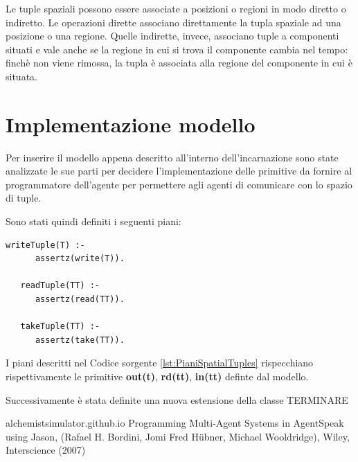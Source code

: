 \documentclass[12pt,a4paper,openright,twoside]{report}
\begin{document}
Le tuple spaziali possono essere associate a posizioni o regioni in modo diretto o indiretto. Le operazioni dirette associano direttamente la tupla spaziale ad una posizione o una regione. Quelle indirette, invece, associano tuple a componenti situati e vale anche se la regione in cui si trova il componente cambia nel tempo: finch\`e non viene rimossa, la tupla \`e associata alla regione del componente in cui \`e situata.


\section{Implementazione modello}
Per inserire il modello appena descritto all'interno dell'incarnazione sono state analizzate le sue parti per decidere l'implementazione delle primitive da fornire al programmatore dell'agente per permettere agli agenti di comunicare con lo spazio di tuple.

Sono stati quindi definiti i seguenti piani:
\medskip
\begin{lstlisting}[firstnumber=1,label={lst:PianiSpatialTuples},caption={Piani Spatial Tuples}]
   writeTuple(T) :-
      assertz(write(T)).

   readTuple(TT) :-
      assertz(read(TT)).

   takeTuple(TT) :-
      assertz(take(TT)).
\end{lstlisting}

I piani descritti nel Codice sorgente \ref{lst:PianiSpatialTuples} rispecchiano rispettivamente le primitive \textbf{out(t)}, \textbf{rd(tt)}, \textbf{in(tt)} definte dal modello.

Successivamente \`e stata definite una nuova estensione della classe
TERMINARE



































\begin{thebibliography}{90} %
\rhead[\fancyplain{}{\bfseries \leftmark}]{\fancyplain{}{\bfseries \thepage}}

 alchemistsimulator.github.io
 Programming Multi-Agent Systems in AgentSpeak using Jason, (Rafael H. Bordini, Jomi Fred H\"{u}bner, Michael Wooldridge), Wiley, Interscience (2007)

\end{thebibliography}
\end{document}
